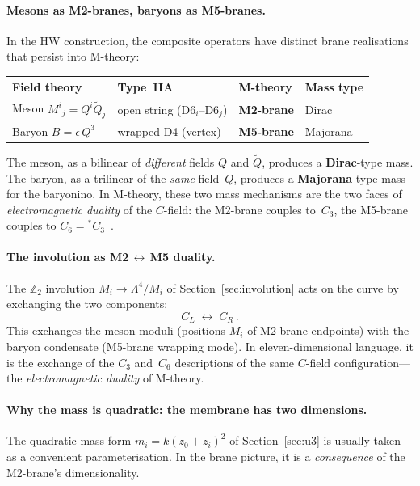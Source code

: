\documentclass[12pt,a4paper]{article}
\begin{document}
\paragraph{Mesons as M2-branes, baryons as M5-branes.}
In the HW construction, the composite operators have distinct brane
realisations that persist into M-theory:
\begin{center}
\begin{tabular}{llll}
\toprule
Field theory & Type~IIA & M-theory & Mass type \\
\midrule
Meson $M^i{}_j = Q^i\tilde{Q}_j$ &
  open string (D6$_i$--D6$_j$) &
  \textbf{M2-brane} & Dirac \\
Baryon $B = \epsilon\,Q^3$ &
  wrapped D4 (vertex) &
  \textbf{M5-brane} & Majorana \\
\bottomrule
\end{tabular}
\end{center}
The meson, as a bilinear of \emph{different} fields $Q$ and
$\tilde{Q}$, produces a \textbf{Dirac}-type mass.  The baryon, as a
trilinear of the \emph{same} field~$Q$, produces a
\textbf{Majorana}-type mass for the baryonino.  In M-theory, these
two mass mechanisms are the two faces of
\emph{electromagnetic duality} of the $C$-field: the M2-brane
couples to~$C_3$, the M5-brane couples to
$C_6 = {}^*C_3$~\cite{Witten:1997M5}.

\paragraph{The involution as M2$\,\leftrightarrow\,$M5 duality.}
The $\mathbb{Z}_2$ involution
$M_i \to \Lambda^4/M_i$ of
Section~\ref{sec:involution} acts on the curve by exchanging the
two components:
\[
  C_L \;\longleftrightarrow\; C_R\,.
\]
This exchanges the meson moduli (positions $M_i$ of M2-brane
endpoints) with the baryon condensate (M5-brane wrapping mode).
In eleven-dimensional language, it is the exchange of the $C_3$
and~$C_6$ descriptions of the same $C$-field configuration---the
\emph{electromagnetic duality} of M-theory.

\paragraph{Why the mass is quadratic: the membrane has two dimensions.}
The quadratic mass form $m_i = k(z_0 + z_i)^2$ of
Section~\ref{sec:u3} is usually taken as a convenient
parameterisation.  In the brane picture, it is a \emph{consequence}
of the M2-brane's dimensionality.
\end{document}
